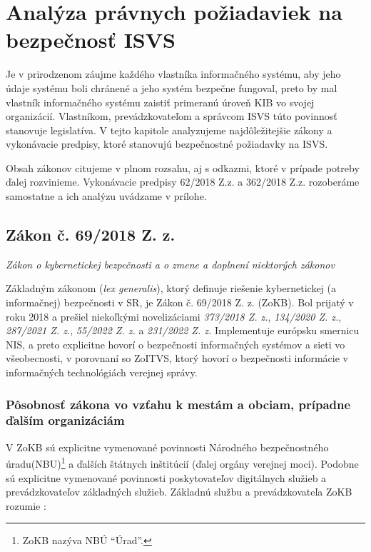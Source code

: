 \chapter{Analýza právnych požiadaviek na bezpečnosť ISVS} \label{chapter:legal-analysis}

\newcommand\lawsubtitle[1]{\begin{flushleft}\small\textit{#1}\end{flushleft}}

Je v prirodzenom záujme každého vlastníka informačného systému, aby jeho údaje systému boli chránené a jeho systém bezpečne
fungoval, preto by mal vlastník informačného systému zaistiť primeranú úroveň KIB vo svojej organizácií. Vlastníkom,
prevádzkovateľom a správcom ISVS túto povinnosť stanovuje legislatíva. V tejto kapitole analyzujeme najdôležitejšie
zákony a vykonávacie predpisy, ktoré stanovujú bezpečnostné požiadavky na ISVS.

Obsah zákonov citujeme v plnom rozsahu, aj s odkazmi, ktoré v prípade potreby ďalej rozvinieme. Vykonávacie predpisy 
62/2018 Z.z.\cite{362/2018} a 362/2018 Z.z.\cite{179/2020} rozoberáme samostatne a ich analýzu uvádzame v prílohe.


\section{Zákon č. 69/2018 Z. z.}
\lawsubtitle{Zákon o kybernetickej bezpečnosti a o zmene a doplnení niektorých zákonov}

Základným zákonom (\textit{lex generalis}), ktorý definuje riešenie kybernetickej (a informačnej) bezpečnosti v SR, je
Zákon č. 69/2018 Z. z. (\acrshort{ZoKB}). Bol prijatý v roku 2018 a prešiel niekoľkými novelizáciami \textit{373/2018 Z. z.},
\textit{134/2020 Z. z.}, \textit{287/2021 Z. z.}, \textit{55/2022 Z. z.} a \textit{231/2022 Z. z.} Implementuje európsku
smernicu \acrshort{NIS}, a preto explicitne hovorí o bezpečnosti informačných systémov a sieti vo všeobecnosti, v porovnaní
so \acrshort{ZoITVS}, ktorý hovorí o bezpečnosti informácie v informačných technológiách verejnej správy.

\subsection{Pôsobnosť zákona vo vzťahu k mestám a obciam, prípadne ďalším organizáciám}

V \acrshort{ZoKB} sú explicitne vymenované povinnosti Národného bezpečnostného úradu(\acrshort{NBU})\footnote{ZoKB nazýva NBÚ
\enquote{Úrad}.} a ďalších štátnych inštitúcií (ďalej orgány verejnej moci). Podobne sú explicitne vymenované povinnosti
poskytovateľov digitálnych služieb a prevádzkovateľov základných služieb. Základnú službu a prevádzkovateľa \acrshort{ZoKB}
rozumie \cite[\S 3 písm. l) a m)]{69/2018}:

